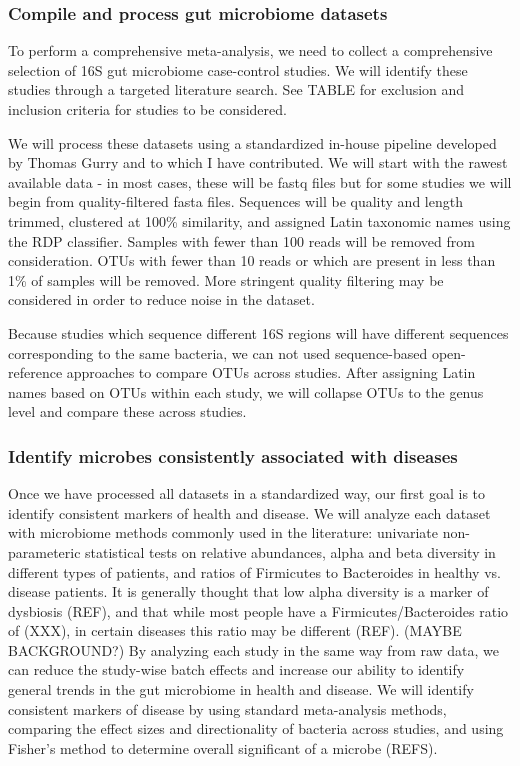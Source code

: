 \documentclass[12pt]{article}
\begin{document}
\subsubsection{Compile and process gut microbiome datasets}
To perform a comprehensive meta-analysis, we need to collect a comprehensive selection of 16S gut microbiome case-control studies. We will identify these studies through a targeted literature search.  See TABLE for exclusion and inclusion criteria for studies to be considered.

We will process these datasets using a standardized in-house pipeline developed by Thomas Gurry and to which I have contributed. We will start with the rawest available data - in most cases, these will be fastq files but for some studies we will begin from quality-filtered fasta files. Sequences will be quality and length trimmed, clustered at 100\% similarity, and assigned Latin taxonomic names using the RDP classifier. Samples with fewer than 100 reads will be removed from consideration. OTUs with fewer than 10 reads or which are present in less than 1\% of samples will be removed. More stringent quality filtering may be considered in order to reduce noise in the dataset.

Because studies which sequence different 16S regions will have different sequences corresponding to the same bacteria, we can not used sequence-based open-reference approaches to compare OTUs across studies. After assigning Latin names based on OTUs within each study, we will collapse OTUs to the genus level and compare these across studies.

\subsubsection{Identify microbes consistently associated with diseases}\label{sec:indep_studies}
Once we have processed all datasets in a standardized way, our first goal is to identify consistent markers of health and disease. We will analyze each dataset with microbiome methods commonly used in the literature: univariate non-parameteric statistical tests on relative abundances, alpha and beta diversity in different types of patients, and ratios of Firmicutes to Bacteroides in healthy vs. disease patients. It is generally thought that low alpha diversity is a marker of dysbiosis (REF), and that while most people have a Firmicutes/Bacteroides ratio of (XXX), in certain diseases this ratio may be different (REF). (MAYBE BACKGROUND?) By analyzing each study in the same way from raw data, we can reduce the study-wise batch effects and increase our ability to identify general trends in the gut microbiome in health and disease. We will identify consistent markers of disease by using standard meta-analysis methods, comparing the effect sizes and directionality of bacteria across studies, and using Fisher's method to determine overall significant of a microbe (REFS). 
\end{document}

